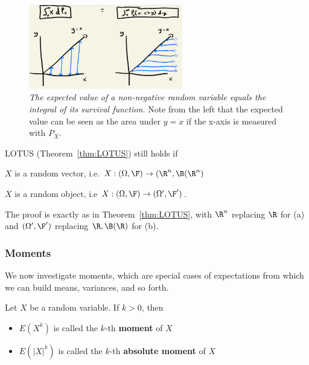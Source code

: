 \documentclass{article} %
\begin{document}
\begin{remark}
\begin{figure}[H]
\centering
\includegraphics[width=0.6\textwidth]{images/expected_value_equals_integral_of_survival_function}
\caption{\textit{The expected value of a non-negative random variable equals the integral of its survival function.}  Note from the left that the expected value can be seen as the area under $y=x$ if the x-axis is measured with $P_X$.}
\label{fig:expected_value_equals_integral_of_survival_function}
\end{figure}

\label{rk:expected_value_equals_integral_of_its_survival_function_more_detail}
\end{remark}



\begin{remark}{}
LOTUS (Theorem~\ref{thm:LOTUS}) still holds if 
\begin{alphabate}
\item $X$ is a random vector, i.e. $X : (\Omega, \F) \to (\R^n, \B(\R^n)$
\item $X$ is a random object, i.e $X: (\Omega, \F) \to (\Omega', \F')$.
\end{alphabate}
The proof is exactly as in Theorem~\ref{thm:LOTUS}, with $\R^n$ replacing $\R$ for (a) and $(\Omega', \F')$ replacing $\R, \B(\R)$ for (b).
\label{rk:LOTUS_applies_for_random_vectors_and_random_objects}
\end{remark}

\subsubsection{Moments}

We now investigate moments, which are special cases of expectations from which we can build means, variances, and so forth.

\begin{definition}
Let $X$ be a random variable.  If $k>0$, then 
\begin{itemize}
\item $E(X^k)$  is called the $k$-th  \textbf{moment} of $X$
\item $E(|X|^k)$  is called the $k$-th  \textbf{absolute moment} of $X$	
\end{itemize}
\end{definition}
\end{document}
